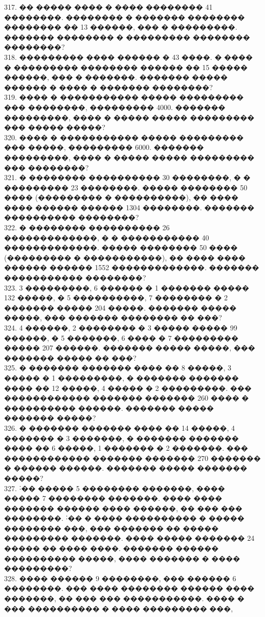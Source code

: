 \documentclass[12pt]{article}
\begin{document}
317. �� ����� ���� � ���� �������� 41 ��������. �������� � ������� �������� �������� �� 13 ������, ��� � ���������. ������� �������� � ��������� �������� ��������?\\
318. ��������� ���� ������ � 43 ����. � ���� � ��������� �������� ������ �� 15 ����� ������, ��� � �������. ������� ����� ������ � ���� � ������� ��������?\\
319. ���� � ����������� ����� ��������� ��� ��������, ��������� 4000. ������� ���������, ���� � ����� ����� ��������� ��� ����� �����?\\
320. ���� � ����������� ����� ��������� ��� �����, ��������� 6000. ������� ���������, ���� � ����� ����� ��������� ��� ��������?\\
321. � �������� ���������� 30 ��������, � � ��������� 23 ��������. ����� �������� 50 ���� (��������� � ����������), �� ���� ���� ������ ������ 1304 ��������.
������� ���������� ��������?\\
322. � �������� ���������� 26 �������������, � � ����������� 40 �������������. ����� �������� 50 ���� (��������� � �����������), �� ���� ���� ������ ������
1552 �������������. ������� ����������� ��������?\\
323. 3 ���������, 6 ������ � 1 ������� ����� 132 �����, � 5 ����������, 7 �������� � 2 ������� ����� 204 �����. ������� ����� �����, ��� ������� �������� �� ���?\\
324. 4 ������, 2 �������� � 3 ����� ����� 99 ������, � 5 �������, 6 ���� � 7 ��������� ����� 207 ������. ������� ����� �����, ��� ������� ����� �� ���?\\
325. � ������� ������� ���� �� 8 �����, 3 ����� � 1 ���������, � ������� ������� ���� �� 12 �����, 4 ����� � 2 ���������. ��� ������������ ������� �������
260 ���� � ���������� ������. ������� ����� ������� �����?\\
326. � ������� ������� ���� �� 14 �����, 4 ������� � 3 �������, � ������� ������� ���� �� 6 �����, 1 ������� � 2 �������. ��� ������������ ������� �������
270 ������� � ������ ������. ������� ����� ������� �����?\\
327. ˸�� ����� 5 �������� �������, ���� ����� 7 �������� �������. ���� ���� ������� ������ ���� ������, �� ��� ��� ��������. ˸�� � ���� ���������� � ����� �������� ���, ��� ������� �� ����� ��������� �������. ���� ����� ������� 24 ����� �� ���� ����. ������� ������ ���������� �����, ���� ������� � ���� ���������?\\
328. ���� ������ 9 ��������, ��� ������ 6 ��������. ��� ���� �������� ������ ���� �������, �� ��� ��� �����������. ���� � ��� ���������� � ���� ��������� ���,
\end{document}
